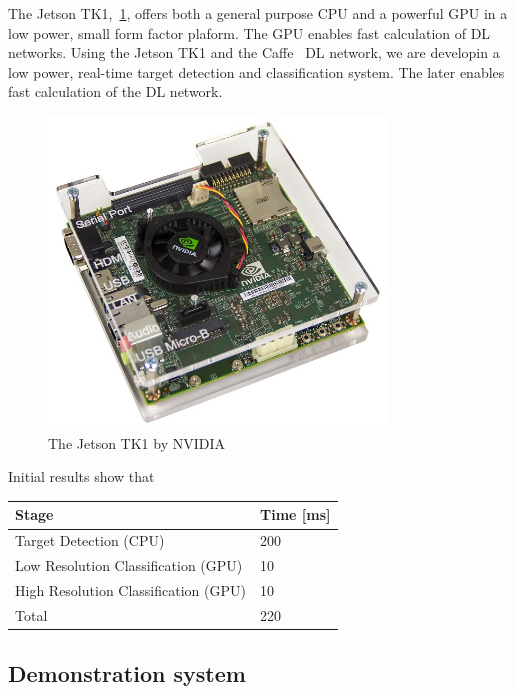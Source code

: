 \documentclass{article} %
\begin{document}
The Jetson TK1,~\cref{fig:jetson}, offers both a general purpose CPU and a powerful GPU
in a low power, small form factor plaform. The GPU enables fast calculation of DL networks.
Using the Jetson TK1 and the Caffe~\cite{jia2014caffe} DL network, we
are developin a low power, real-time target detection and classification system.
The later enables fast calculation of the DL network.  
\begin{figure}[h]
	\centering
	\includegraphics[width=0.8\textwidth]{jetson}
	\caption{The Jetson TK1 by NVIDIA}
	\label{fig:jetson}
\end{figure}

Initial results show that 

\begin{center}
	\begin{tabular}{ | l | l | }
		\hline
		Stage 										& Time [ms] 	\\ \hline
		Target Detection (CPU) 						& 200      		\\ \hline
		Low Resolution Classification (GPU) 		& 10 			\\ \hline
		High Resolution Classification (GPU)		& 10 			\\ \hline
		Total 						 				& 220 			\\ \hline
	\end{tabular}
\end{center}

\subsection{Demonstration system}
\end{document}
